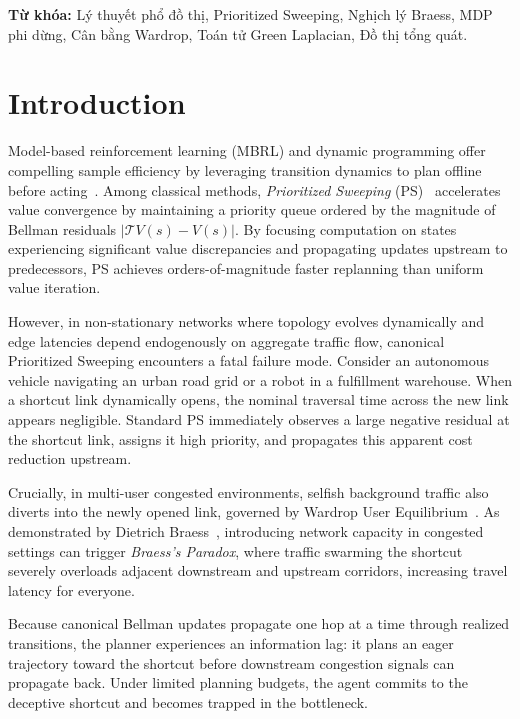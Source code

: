 \documentclass[11pt,a4paper]{article}
\begin{document}
\vspace{0.5em}
\noindent\textbf{Từ khóa:} Lý thuyết phổ đồ thị, Prioritized Sweeping, Nghịch lý Braess, MDP phi dừng, Cân bằng Wardrop, Toán tử Green Laplacian, Đồ thị tổng quát.

\newpage

\section{Introduction}
\label{sec:intro}

Model-based reinforcement learning (MBRL) and dynamic programming offer compelling sample efficiency by leveraging transition dynamics to plan offline before acting~\cite{sutton2018reinforcement}. Among classical methods, \textit{Prioritized Sweeping} (PS)~\cite{peng1993efficient,moore1993prioritized} accelerates value convergence by maintaining a priority queue ordered by the magnitude of Bellman residuals $|\mathcal{T}V(s) - V(s)|$. By focusing computation on states experiencing significant value discrepancies and propagating updates upstream to predecessors, PS achieves orders-of-magnitude faster replanning than uniform value iteration.

However, in non-stationary networks where topology evolves dynamically and edge latencies depend endogenously on aggregate traffic flow, canonical Prioritized Sweeping encounters a fatal failure mode. Consider an autonomous vehicle navigating an urban road grid or a robot in a fulfillment warehouse. When a shortcut link dynamically opens, the nominal traversal time across the new link appears negligible. Standard PS immediately observes a large negative residual at the shortcut link, assigns it high priority, and propagates this apparent cost reduction upstream. 

Crucially, in multi-user congested environments, selfish background traffic also diverts into the newly opened link, governed by Wardrop User Equilibrium~\cite{wardrop1952road}. As demonstrated by Dietrich Braess~\cite{braess1968paradoxon}, introducing network capacity in congested settings can trigger \textit{Braess's Paradox}, where traffic swarming the shortcut severely overloads adjacent downstream and upstream corridors, increasing travel latency for everyone.

Because canonical Bellman updates propagate one hop at a time through realized transitions, the planner experiences an information lag: it plans an eager trajectory toward the shortcut before downstream congestion signals can propagate back. Under limited planning budgets, the agent commits to the deceptive shortcut and becomes trapped in the bottleneck.
\end{document}
